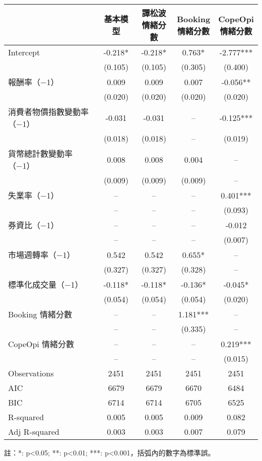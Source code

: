 \documentclass{article}
\begin{document}
    \fontsize{12pt}{14pt}\selectfont
    
    \begin{tabular}{lcccc}
\toprule
 & 基本模型 & \makecell{譚松波\\情緒分數} & \makecell{Booking\\情緒分數} & \makecell{CopeOpi\\情緒分數} \\
\midrule
Intercept & -0.218* & -0.218* & 0.763* & -2.777*** \\
 & (0.105) & (0.105) & (0.305) & (0.400) \\
報酬率（−1） & 0.009 & 0.009 & 0.007 & -0.056** \\
 & (0.020) & (0.020) & (0.020) & (0.020) \\
消費者物價指數變動率（−1） & -0.031 & -0.031 & -- & -0.125*** \\
 & (0.018) & (0.018) & -- & (0.019) \\
貨幣總計數變動率（−1） & 0.008 & 0.008 & 0.004 & -- \\
 & (0.009) & (0.009) & (0.009) & -- \\
失業率（−1） & -- & -- & -- & 0.401*** \\
 & -- & -- & -- & (0.093) \\
券資比（−1） & -- & -- & -- & -0.012 \\
 & -- & -- & -- & (0.007) \\
市場週轉率（−1） & 0.542 & 0.542 & 0.655* & -- \\
 & (0.327) & (0.327) & (0.328) & -- \\
標準化成交量（−1） & -0.118* & -0.118* & -0.136* & -0.045* \\
 & (0.054) & (0.054) & (0.054) & (0.020) \\
Booking 情緒分數 & -- & -- & 1.181*** & -- \\
 & -- & -- & (0.335) & -- \\
CopeOpi 情緒分數 & -- & -- & -- & 0.219*** \\
 & -- & -- & -- & (0.015) \\
\midrule
Observations &   2451 &   2451 &   2451 &   2451 \\
AIC &    6679 &    6679 &    6670 &    6484 \\
BIC &    6714 &    6714 &    6705 &    6525 \\
R-squared &    0.005 &    0.005 &    0.009 &    0.082 \\
Adj R-squared &    0.003 &    0.003 &    0.007 &    0.079 \\
\bottomrule
\end{tabular}

    
    \fontsize{11pt}{14pt}\selectfont
    註：*: p<0.05; **: p<0.01; ***: p<0.001，括弧內的數字為標準誤。
    
\end{document}
